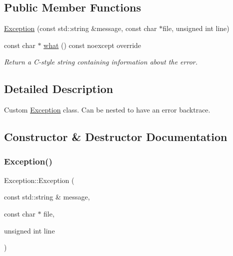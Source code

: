 \subsection*{Public Member Functions}
\begin{DoxyCompactItemize}
\item 
\hyperlink{classException_a53bf3b11d41090b81619796fc3a44b2c}{Exception} (const std\+::string \&message, const char $\ast$file, unsigned int line)
\item 
\mbox{\label{classException_ae7ba8334eb35e001b4b0c6df9339c0dc}} 
const char $\ast$ \hyperlink{classException_ae7ba8334eb35e001b4b0c6df9339c0dc}{what} () const noexcept override
\begin{DoxyCompactList}\small\item\em Return a C-\/style string containing information about the error. \end{DoxyCompactList}\end{DoxyCompactItemize}


\subsection{Detailed Description}
Custom \hyperlink{classException}{Exception} class. Can be nested to have an error backtrace. 

\subsection{Constructor \& Destructor Documentation}
\mbox{\label{classException_a53bf3b11d41090b81619796fc3a44b2c}} 
\subsubsection{\texorpdfstring{Exception()}{Exception()}}
{\footnotesize\ttfamily Exception\+::\+Exception (\begin{DoxyParamCaption}\item[{const std\+::string \&}]{message,  }\item[{const char $\ast$}]{file,  }\item[{unsigned int}]{line }\end{DoxyParamCaption})\hspace{0.3cm}{\ttfamily [inline]}}

